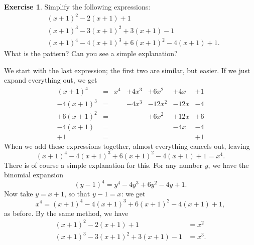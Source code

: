 \documentclass[a4paper]{book}
\theoremstyle{definition}
\newtheorem{exercise}[theorem]{Exercise}
\renewenvironment{solution}{\SolutionInline}{\endSolutionInline}
\begin{document}
\begin{exercise}
 Simplify the following expressions:
 \begin{align*}
  & (x+1)^2 - 2(x+1) + 1 \\
  & (x+1)^3 - 3(x+1)^2 + 3(x+1) - 1 \\
  & (x+1)^4 - 4(x+1)^3 + 6(x+1)^2 - 4(x+1) + 1.
 \end{align*}
 What is the pattern?  Can you see a simple explanation?
\end{exercise}
\begin{solution}
 We start with the last expression; the first two are similar, but
 easier.  If we just expand everything out, we get
 \[ \begin{array}{lclllll}
   (x+1)^4   &=& x^4 & + 4x^3 & + 6x^2 & + 4x & + 1 \\
   -4(x+1)^3 &=&     & - 4x^3 & -12x^2 & -12x & - 4 \\
   +6(x+1)^2 &=&     &        & + 6x^2 & +12x & + 6 \\
   -4(x+1)   &=&     &        &        & - 4x & - 4 \\
   +1        &=&     &        &        &      & + 1
 \end{array} \]
 When we add these expressions together, almost everything cancels
 out, leaving
 \[ (x+1)^4 - 4(x+1)^3 + 6(x+1)^2 - 4(x+1) + 1 = x^4. \]
 There is of course a simple explanation for this.  For any number
 $y$, we have the binomial expansion
 \[ (y-1)^4 = y^4 - 4y^3 + 6y^2 - 4y + 1. \]
 Now take $y=x+1$, so that $y-1=x$: we get
 \[ x^4 = (x+1)^4 - 4(x+1)^3 + 6(x+1)^2 - 4(x+1) + 1, \]
 as before.  By the same method, we have
 \begin{align*}
  (x+1)^2 - 2(x+1) + 1            &= x^2 \\
  (x+1)^3 - 3(x+1)^2 + 3(x+1) - 1 &= x^3.
 \end{align*}
\end{solution}
\end{document}
